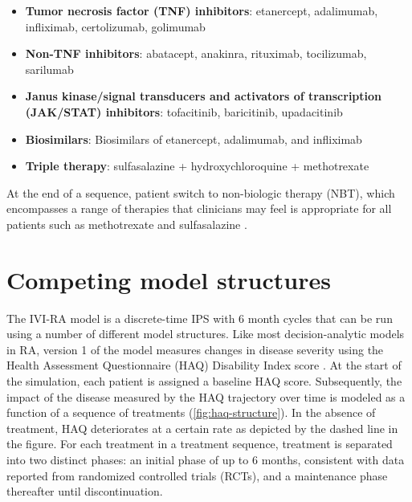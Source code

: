 \documentclass[11pt,final,fleqn]{article}
\theoremstyle{plain}
\begin{document}
\begin{itemize}
\item \textbf{Tumor necrosis factor (TNF) inhibitors}: etanercept, adalimumab, infliximab, certolizumab, golimumab
\item \textbf{Non-TNF inhibitors}: abatacept, anakinra, rituximab, tocilizumab, sarilumab
\item \textbf{Janus kinase/signal transducers and activators of transcription (JAK/STAT) inhibitors}: tofacitinib, baricitinib, upadacitinib
\item \textbf{Biosimilars}: Biosimilars of etanercept, adalimumab, and infliximab
\item \textbf{Triple therapy}: sulfasalazine + hydroxychloroquine + methotrexate
\end{itemize}

At the end of a sequence, patient switch to non-biologic therapy (NBT), which encompasses a range of therapies that clinicians may feel is appropriate for all patients such as methotrexate and sulfasalazine \citep{stevenson2016adalimumab, stevenson2017cost}.

\section{Competing model structures}\label{sec:model-structures}
The IVI-RA model is a discrete-time IPS with 6 month cycles that can be run using a number of different model structures. Like most decision-analytic models in RA, version 1 of the model measures changes in disease severity using the Health Assessment Questionnaire (HAQ) Disability Index score \citep{brennan2003modelling, wailoo2008biologic, tosh2011sheffield, carlson2015economic, stephens2015modelling, athanasakis2015cost, stevenson2016adalimumab, icer2017tim, stevenson2017cost}. At the start of the simulation, each patient is assigned a baseline HAQ score. Subsequently, the impact of the disease measured by the HAQ trajectory over time is modeled as a function of a sequence of treatments (\autoref{fig:haq-structure}). In the absence of treatment, HAQ deteriorates at a certain rate as depicted by the dashed line in the figure. For each treatment in a treatment sequence, treatment is separated into two distinct phases: an initial phase of up to 6 months, consistent with data reported from randomized controlled trials (RCTs), and a maintenance phase thereafter until discontinuation. 
\end{document}
